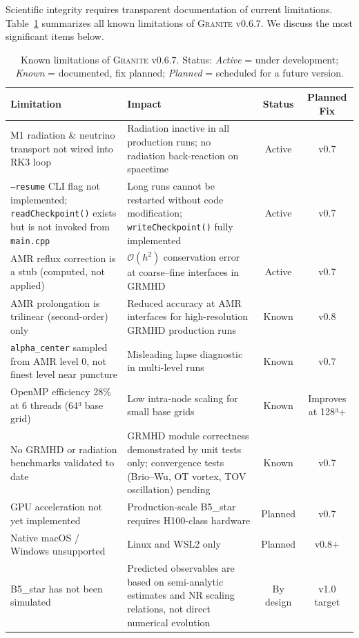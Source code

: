 \documentclass[aps,prd,twocolumn,superscriptaddress,nofootinbib,showpacs,
               longbibliography]{revtex4-2}
\newcommand{\granite}{\textsc{Granite}}
\newcommand{\code}[1]{\texttt{#1}}
\newcommand{\order}[1]{\mathcal{O}(#1)}
\begin{document}
Scientific integrity requires transparent documentation of current limitations.
Table~\ref{tab:limitations} summarizes all known limitations of \granite{}
v0.6.7.
We discuss the most significant items below.

\begin{table}[t]
\caption{Known limitations of \granite{} v0.6.7. Status: \textit{Active} =
  under development; \textit{Known} = documented, fix planned;
  \textit{Planned} = scheduled for a future version.}
\label{tab:limitations}
\begin{ruledtabular}
\begin{tabular}{p{6cm}p{4.5cm}cc}
  Limitation & Impact & Status & Planned Fix \\ \hline
  M1 radiation \& neutrino transport not wired into RK3 loop
    & Radiation inactive in all production runs; no radiation back-reaction on spacetime
    & Active & v0.7 \\[2pt]
  \code{--resume} CLI flag not implemented;
    \code{readCheckpoint()} exists but is not invoked from \code{main.cpp}
    & Long runs cannot be restarted without code modification;
      \code{writeCheckpoint()} fully implemented
    & Active & v0.7 \\[2pt]
  AMR reflux correction is a stub (computed, not applied)
    & $\order{h^2}$ conservation error at coarse--fine interfaces in GRMHD
    & Active & v0.7 \\[2pt]
  AMR prolongation is trilinear (second-order) only
    & Reduced accuracy at AMR interfaces for high-resolution GRMHD production runs
    & Known & v0.8 \\[2pt]
  \code{alpha\_center} sampled from AMR level 0, not finest level near puncture
    & Misleading lapse diagnostic in multi-level runs
    & Known & v0.7 \\[2pt]
  OpenMP efficiency 28\% at 6 threads (64³ base grid)
    & Low intra-node scaling for small base grids
    & Known & Improves at 128³+ \\[2pt]
  No GRMHD or radiation benchmarks validated to date
    & GRMHD module correctness demonstrated by unit tests only;
      convergence tests (Brio--Wu, OT vortex, TOV oscillation) pending
    & Known & v0.7 \\[2pt]
  GPU acceleration not yet implemented
    & Production-scale B5\_star requires H100-class hardware
    & Planned & v0.7 \\[2pt]
  Native macOS / Windows unsupported
    & Linux and WSL2 only
    & Planned & v0.8+ \\[2pt]
  B5\_star has not been simulated
    & Predicted observables are based on semi-analytic estimates
      and NR scaling relations, not direct numerical evolution
    & By design & v1.0 target \\
\end{tabular}
\end{ruledtabular}
\end{table}
\end{document}
